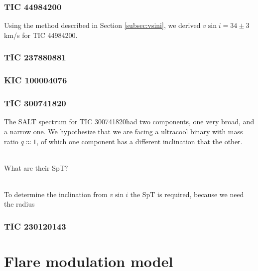 \documentclass[fleqn,usenatbib,letters]{mnras}%
\newcommand{\FB}{TIC 44984200} %
\newcommand{\FC}{TIC 237880881} %
\newcommand{\FE}{KIC 100004076} %
\newcommand{\FF}{TIC 300741820} %
\newcommand{\FG}{TIC 230120143} %
\begin{document}
\subsubsection{\FB}
\label{sec:propsB}
Using the method described in Section \ref{subsec:vsini}, we derived $v\sin i=34\pm3$ km/s for \FB.

\subsubsection{\FC}
\label{sec:propsC}

\subsubsection{\FE}
\label{sec:propsE}

\subsubsection{\FF}
\label{sec:propsF}
The SALT spectrum for \FF had two components, one very broad, and a narrow one. We hypothesize that we are facing a ultracool binary with mass ratio $q\approx 1$, of which one component has a different inclination that the other. 

\\

What are their SpT?

\\

To determine the inclination from $v\sin i$ the SpT is required, because we need the radius

\subsubsection{\FG}
\label{sec:propsG}

\section{Flare modulation model}
\label{sec:model}
\end{document}
